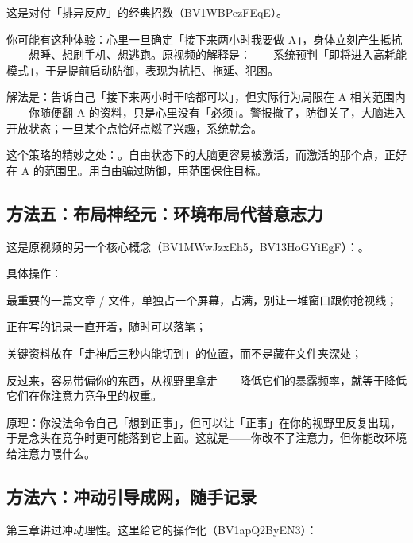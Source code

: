 这是对付「排异反应」的经典招数（BV1WBPezFEqE）。

你可能有这种体验：心里一旦确定「接下来两小时我要做 A」，身体立刻产生抵抗——想睡、想刷手机、想逃跑。原视频的解释是：——系统预判「即将进入高耗能模式」，于是提前启动防御，表现为抗拒、拖延、犯困。

解法是：告诉自己「接下来两小时干啥都可以」，但实际行为局限在 A 相关范围内——你随便翻 A 的资料，只是心里没有「必须」。警报撤了，防御关了，大脑进入开放状态；一旦某个点恰好点燃了兴趣，系统就会。

\begin{insight}
这个策略的精妙之处：。自由状态下的大脑更容易被激活，而激活的那个点，正好在 A 的范围里。用自由骗过防御，用范围保住目标。
\end{insight}

\subsection{方法五：布局神经元：环境布局代替意志力}

这是原视频的另一个核心概念（BV1MWwJzxEh5，BV13HoGYiEgF）：。

具体操作：

\begin{checklist}
  \item 最重要的一篇文章 / 文件，单独占一个屏幕，占满，别让一堆窗口跟你抢视线；
  \item 正在写的记录一直开着，随时可以落笔；
  \item 关键资料放在「走神后三秒内能切到」的位置，而不是藏在文件夹深处；
  \item 反过来，容易带偏你的东西，从视野里拿走——降低它们的暴露频率，就等于降低它们在你注意力竞争里的权重。
\end{checklist}

原理：你没法命令自己「想到正事」，但可以让「正事」在你的视野里反复出现，于是念头在竞争时更可能落到它上面。这就是——你改不了注意力，但你能改环境给注意力喂什么。

\subsection{方法六：冲动引导成网，随手记录}

第三章讲过冲动理性。这里给它的操作化（BV1apQ2ByEN3）：

